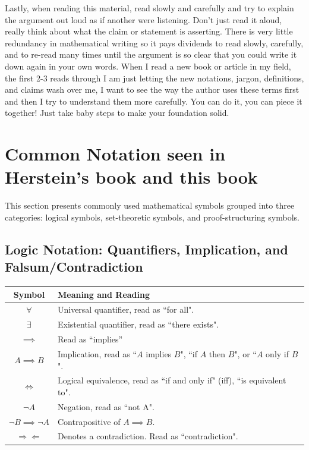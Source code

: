 Lastly, when reading this material, read slowly and carefully and try to explain the argument out loud as if another were listening. Don't just read it aloud, really think about what the claim or statement is asserting. There is very little redundancy in mathematical writing so it pays dividends to read slowly, carefully, and to re-read many times until the argument is so clear that you could write it down again in your own words. When I read a new book or article in my field, the first 2-3 reads through I am just letting the new notations, jargon, definitions, and claims wash over me, I want to see the way the author uses these terms first and then I try to understand them more carefully. You can do it, you can piece it together! Just take baby steps to make your foundation solid. \newpage

\section{Common Notation seen in Herstein's book and this book}
This section presents commonly used mathematical symbols grouped into three categories: logical symbols, set-theoretic symbols, and proof-structuring symbols.

\subsection{Logic Notation: Quantifiers, Implication, and Falsum/Contradiction}

\begin{center}
\begin{tabular}{|c|l|}
    \hline
    \textbf{Symbol} & \textbf{Meaning and Reading} \\
    \hline
    $\forall$ & Universal quantifier, read as ``for all". \index{$\forall$}\\
    $\exists$ & Existential quantifier, read as ``there exists". \index{$\exists$} \\
    $\implies$ & Read as ``implies'' \index{$\implies$}\\
    $A \implies B$ & Implication, read as ``$A$ implies $B$", ``if $A$ then $B$", or ``$A$ only if $B$". \\
    $\iff$ & Logical equivalence, read as ``if and only if" (iff), ``is equivalent to". \index{$\iff$}\\
    $\lnot A$ & Negation, read as ``not A". \index{$\lnot$}\\
    $\lnot B \implies \lnot A$ & Contrapositive of $A \implies B$. \\
    $\Rightarrow\Leftarrow$ & Denotes a contradiction. Read as ``contradiction". \index{$\Rightarrow \Leftarrow$} \\
    \hline
\end{tabular}
\end{center}

